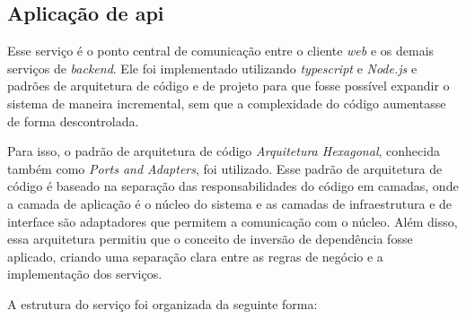 \subsection{Aplicação de \gls{api}}
\label{subsec:aplicacaoDeAPI}

Esse serviço é o ponto central de comunicação entre o cliente \textit{web} e os demais serviços de \textit{backend}. 
Ele foi implementado utilizando \textit{typescript} e \textit{Node.js} e padrões de arquitetura de código e de projeto para que fosse possível expandir o sistema de maneira incremental, sem que a complexidade do código aumentasse de forma descontrolada.

Para isso, o padrão de arquitetura de código \textit{Arquitetura Hexagonal}, conhecida também como \textit{Ports and Adapters}, foi utilizado. Esse padrão de arquitetura de código é baseado na separação das responsabilidades do código em camadas, onde a camada de aplicação é o núcleo do sistema e as camadas de infraestrutura e de interface são adaptadores que permitem a comunicação com o núcleo. Além disso, essa arquitetura permitiu que o conceito de inversão de dependência fosse aplicado, criando uma separação clara entre as regras de negócio e a implementação dos serviços.


A estrutura do serviço foi organizada da seguinte forma:

\hfill\break
\hfill\break
\hfill\break
\hfill\break

